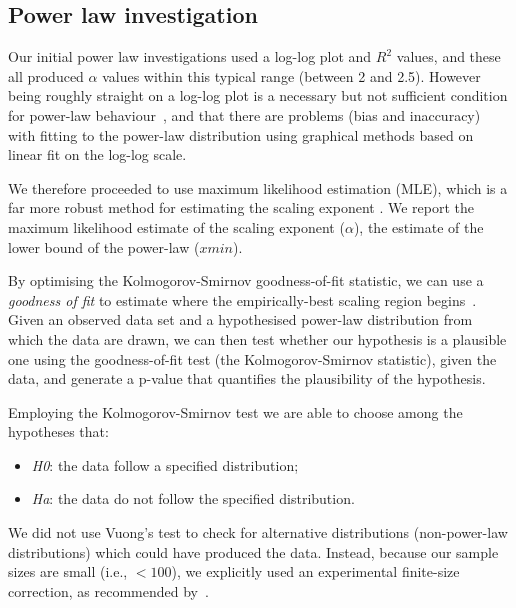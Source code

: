 \documentclass[conference]{IEEEtran}
\theoremstyle{definition}
\begin{document}
\subsection{Power law investigation}\label{sec:powerlaw}



Our initial power law investigations used a log-log plot and $R^2$
values, and these all produced $\alpha$ values within this typical
range (between 2 and 2.5). However being roughly straight on a log-log
plot is a necessary but not sufficient condition for power-law
behaviour~\cite{ClausetShaliziNewman2009}, and that there are problems
(bias and inaccuracy) with fitting to the power-law distribution using
graphical methods based on linear fit on the log-log scale.

We therefore proceeded to use maximum likelihood estimation (MLE),
which is a far more robust method for estimating the scaling exponent
\cite{GoldsteinMorrisYen2004,ClausetShaliziNewman2009}. We report the
maximum likelihood estimate of the scaling exponent ($\alpha$), the
estimate of the lower bound of the power-law ($xmin$).

By optimising the Kolmogorov-Smirnov goodness-of-fit statistic, we can
use a \emph{goodness of fit} to estimate where the empirically-best
scaling region begins~\cite{ClausetShaliziNewman2009}. Given an
observed data set and a hypothesised power-law distribution from which
the data are drawn, we can then test whether our hypothesis is a
plausible one using the goodness-of-fit test (the Kolmogorov-Smirnov
statistic), given the data, and generate a p-value that quantifies the
plausibility of the hypothesis.

Employing the Kolmogorov-Smirnov test we are able to choose among the
hypotheses that: 

\begin{itemize}
\item \emph{H0}: the data follow a specified distribution;
\item \emph{Ha}: the data do not follow the specified distribution. 
\end{itemize}

We did not use Vuong's test to check for alternative distributions
(non-power-law distributions) which could have produced the
data. Instead, because our sample sizes are small (i.e., $< 100$), we
explicitly used an experimental finite-size correction, as recommended
by~\cite{ClausetShaliziNewman2009}.
\end{document}
